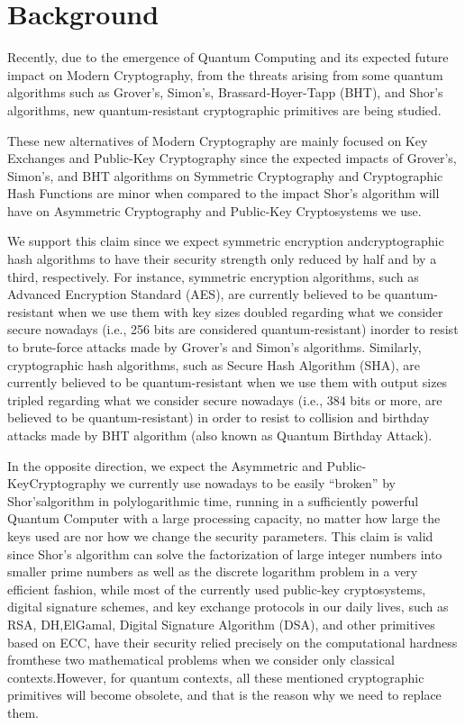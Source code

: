 \documentclass[runningheads]{llncs}
\numberwithin{equation}{section}
\begin{document}
    \section{Background}
    \label{sec:background}

    Recently, due to the emergence of Quantum Computing and its expected future impact on Modern Cryptography, from the threats arising from some quantum algorithms such as Grover's, Simon's, Brassard-Hoyer-Tapp (BHT), and Shor's algorithms, new quantum-resistant cryptographic primitives are being studied.
    
    These new alternatives of Modern Cryptography are mainly focused on Key Exchanges and Public-Key Cryptography since the expected impacts of Grover's, Simon's, and BHT algorithms on Symmetric Cryptography and Cryptographic Hash Functions are minor when compared to the impact Shor's algorithm will have on Asymmetric Cryptography and Public-Key Cryptosystems we use.
    
    We support this claim since we expect symmetric encryption and\break cryptographic hash algorithms to have their security strength only reduced by half and by a third, respectively. For instance, symmetric encryption algorithms, such as Advanced Encryption Standard (AES), are currently believed to be quantum-resistant when we use them with key sizes doubled regarding what we consider secure nowadays (i.e., 256 bits are considered quantum-resistant) in\break order to resist to brute-force attacks made by Grover's and Simon's algorithms. Similarly, cryptographic hash algorithms, such as Secure Hash Algorithm (SHA), are currently believed to be quantum-resistant when we use them with output sizes tripled regarding what we consider secure nowadays (i.e., 384 bits or more, are believed to be quantum-resistant) in order to resist to collision and birthday attacks made by BHT algorithm (also known as Quantum Birthday Attack).

    In the opposite direction, we expect the Asymmetric and Public-Key\break Cryptography we currently use nowadays to be easily ``broken'' by Shor's\break algorithm in polylogarithmic time, running in a sufficiently powerful Quantum Computer with a large processing capacity, no matter how large the keys used are nor how we change the security parameters. This claim is valid since Shor's algorithm can solve the factorization of large integer numbers into smaller prime numbers as well as the discrete logarithm problem in a very efficient fashion, while most of the currently used public-key cryptosystems, digital signature schemes, and key exchange protocols in our daily lives, such as RSA, DH,\break ElGamal, Digital Signature Algorithm (DSA), and other primitives based on ECC, have their security relied precisely on the computational hardness from\break these two mathematical problems when we consider only classical contexts.\break However, for quantum contexts, all these mentioned cryptographic primitives will become obsolete, and that is the reason why we need to replace them.
\end{document}
